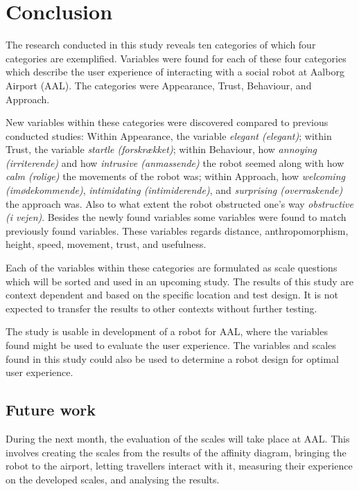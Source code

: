 \section{Conclusion}
\label{Conclusion}
%
The research conducted in this study reveals ten categories of which four categories are exemplified. Variables were found for each of these four categories which describe the user experience of interacting with a social robot at Aalborg Airport (AAL). The categories were Appearance, Trust, Behaviour, and Approach.

New variables within these categories were discovered compared to previous conducted studies: Within Appearance, the variable \textit{elegant (elegant)}; within Trust, the variable \textit{startle (forskrækket)}; within Behaviour, how \textit{annoying (irriterende)} and how \textit{intrusive (anmassende)} the robot seemed along with how \textit{calm (rolige)} the movements of the robot was; within Approach, how \textit{welcoming (imødekommende)}, \textit{intimidating (intimiderende)}, and \textit{surprising (overraskende)} the approach was. Also to what extent the robot obstructed one's way \textit{obstructive (i vejen)}. Besides the newly found variables some variables were found to match previously found variables. These variables regards distance, anthropomorphism, height, speed, movement, trust, and usefulness.

Each of the variables within these categories are formulated as scale questions which will be sorted and used in an upcoming study. The results of this study are context dependent and based on the specific location and test design. It is not expected to transfer the results to other contexts without further testing. 

The study is usable in development of a robot for AAL, where the variables found might be used to evaluate the user experience. The variables and scales found in this study could also be used to determine a robot design for optimal user experience.

\subsection{Future work}
During the next month, the evaluation of the scales will take place at AAL. This involves creating the scales from the results of the affinity diagram, bringing the robot to the airport, letting travellers interact with it, measuring their experience on the developed scales, and analysing the results.


